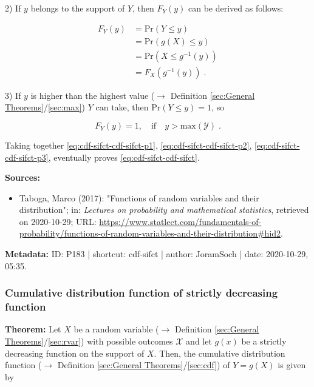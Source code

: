 \documentclass[a4paper,12pt,twoside]{book}
\begin{document}
2) If $y$ belongs to the support of $Y$, then $F_Y(y)$ can be derived as follows:

\begin{equation} \label{eq:cdf-sifct-cdf-sifct-p2}
\begin{split}
F_Y(y) &= \mathrm{Pr}(Y \leq y) \\
&= \mathrm{Pr}(g(X) \leq y) \\
&= \mathrm{Pr}(X \leq g^{-1}(y)) \\
&= F_X(g^{-1}(y)) \; .
\end{split}
\end{equation}

3) If $y$ is higher than the highest value ($\rightarrow$ Definition \ref{sec:General Theorems}/\ref{sec:max}) $Y$ can take, then $\mathrm{Pr}(Y \leq y) = 1$, so

\begin{equation} \label{eq:cdf-sifct-cdf-sifct-p3}
F_Y(y) = 1, \quad \text{if} \quad y > \mathrm{max}(\mathcal{Y}) \; .
\end{equation}

Taking together \eqref{eq:cdf-sifct-cdf-sifct-p1}, \eqref{eq:cdf-sifct-cdf-sifct-p2}, \eqref{eq:cdf-sifct-cdf-sifct-p3}, eventually proves \eqref{eq:cdf-sifct-cdf-sifct}.


\vspace{1em}
\textbf{Sources:}
\begin{itemize}
\item Taboga, Marco (2017): "Functions of random variables and their distribution"; in: \textit{Lectures on probability and mathematical statistics}, retrieved on 2020-10-29; URL: \url{https://www.statlect.com/fundamentals-of-probability/functions-of-random-variables-and-their-distribution#hid2}.
\end{itemize}


\vspace{1em}
\textbf{Metadata:} ID: P183 | shortcut: cdf-sifct | author: JoramSoch | date: 2020-10-29, 05:35.
\vspace{1em}



\subsubsection[\textbf{Cumulative distribution function of strictly decreasing function}]{Cumulative distribution function of strictly decreasing function} \label{sec:cdf-sdfct}
\setcounter{equation}{0}

\textbf{Theorem:} Let $X$ be a random variable ($\rightarrow$ Definition \ref{sec:General Theorems}/\ref{sec:rvar}) with possible outcomes $\mathcal{X}$ and let $g(x)$ be a strictly decreasing function on the support of $X$. Then, the cumulative distribution function ($\rightarrow$ Definition \ref{sec:General Theorems}/\ref{sec:cdf}) of $Y = g(X)$ is given by
\end{document}
